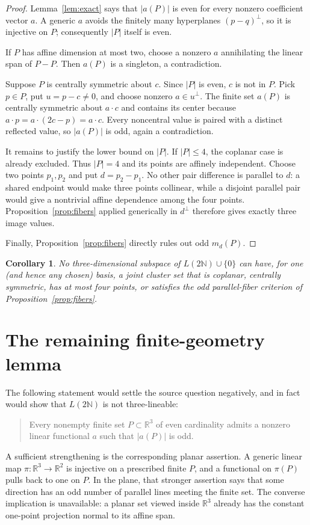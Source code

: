 \documentclass[11pt]{article}
\newtheorem{corollary}{Corollary}
\newcommand{\R}{\mathbb R}
\newcommand{\N}{\mathbb N}
\begin{document}
\begin{proof}
Lemma~\ref{lem:exact} says that $|a(P)|$ is even for every nonzero coefficient
vector $a$.  A generic $a$ avoids the finitely many hyperplanes
$(p-q)^\perp$, so it is injective on $P$; consequently $|P|$ itself is even.

If $P$ has affine dimension at most two, choose a nonzero $a$ annihilating
the linear span of $P-P$.  Then $a(P)$ is a singleton, a contradiction.

Suppose $P$ is centrally symmetric about $c$.  Since $|P|$ is even, $c$ is
not in $P$.  Pick $p\in P$, put $u=p-c\ne0$, and choose nonzero
$a\in u^\perp$.  The finite set $a(P)$ is centrally symmetric about $a\cdot c$
and contains its center because $a\cdot p=a\cdot(2c-p)=a\cdot c$.  Every
noncentral value is paired with a distinct reflected value, so $|a(P)|$ is
odd, again a contradiction.

It remains to justify the lower bound on $|P|$.  If $|P|\le4$, the coplanar
case is already excluded.  Thus $|P|=4$ and its points are affinely
independent.  Choose two points $p_1,p_2$ and put $d=p_2-p_1$.  No other
pair difference is parallel to $d$: a shared endpoint would make three
points collinear, while a disjoint parallel pair would give a nontrivial
affine dependence among the four points.  Proposition~\ref{prop:fibers}
applied generically in $d^\perp$ therefore gives exactly three image values.

Finally, Proposition~\ref{prop:fibers} directly rules out odd $m_d(P)$.
\end{proof}

\begin{corollary}\label{cor:classes}
No three-dimensional subspace of $L(2\N)\cup\{0\}$ can have, for one (and
hence any chosen) basis, a joint cluster set that is coplanar, centrally
symmetric, has at most four points, or satisfies the odd parallel-fiber
criterion of Proposition~\ref{prop:fibers}.
\end{corollary}

\section{The remaining finite-geometry lemma}

The following statement would settle the source question negatively, and in
fact would show that $L(2\N)$ is not three-lineable:
\begin{quote}
Every nonempty finite set $P\subset\R^3$ of even cardinality admits a nonzero
linear functional $a$ such that $|a(P)|$ is odd.
\end{quote}
A sufficient strengthening is the corresponding planar assertion.  A generic
linear map $\pi:\R^3\to\R^2$ is injective on a prescribed finite $P$, and a
functional on $\pi(P)$ pulls back to one on $P$.  In the plane, that stronger
assertion says that some direction has an odd number of parallel lines meeting
the finite set.  The converse implication is unavailable: a planar set viewed
inside $\R^3$ already has the constant one-point projection normal to its
affine span.
\end{document}
